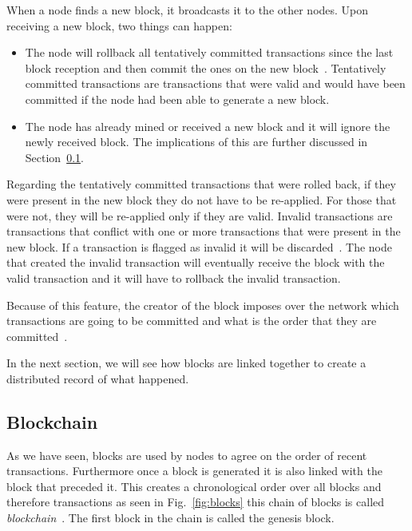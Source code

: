 When a node finds a new block, it broadcasts it to the other nodes. Upon receiving a new block, two things can happen:
\begin{itemize}
\item The node will rollback all tentatively committed transactions since the last block reception and then commit the ones on the new block~\cite{decker2013information}. Tentatively committed transactions are transactions that were valid and would have been committed if the node had been able to generate a new block.
\item The node has already mined or received a new block and it will ignore the newly received block. The implications of this are further discussed in Section~\ref{sec:blockchain}.
\end{itemize}

Regarding the tentatively committed transactions that were rolled back, if they were present in the new block they do not have to be re-applied. For those that were not, they will be re-applied only if they are valid. Invalid transactions are transactions that conflict with one or more transactions that were present in the new block. If a transaction is flagged as invalid it will be discarded~\cite{decker2013information}. The node that created the invalid transaction will eventually receive the block with the valid transaction and it will have to rollback the invalid transaction.

Because of this feature, the creator of the block imposes over the network which transactions are going to be committed and what is the order that they are committed~\cite{decker2013information}.

In the next section, we will see how blocks are linked together to create a distributed record of what happened. 

\subsection{Blockchain}
\label{sec:blockchain}
As we have seen, blocks are used by nodes to agree on the order of recent transactions. Furthermore once a block is generated it is also linked with the block that preceded it. This creates a chronological order over all blocks and therefore transactions as seen in Fig.~\ref{fig:blocks} this chain of blocks is called \textit{blockchain}~\cite{decker2013information}. The first block in the chain is called the genesis block.


